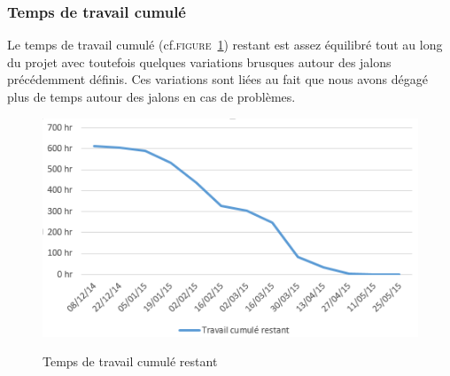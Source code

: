 \subsubsection{Temps de travail cumulé}
Le temps de travail cumulé (cf.\textsc{figure~\ref{fig:avancement}}) restant est assez équilibré tout au long du projet avec toutefois quelques variations brusques autour des jalons précédemment définis.
Ces variations sont liées au fait que nous avons dégagé plus de temps autour des jalons en cas de problèmes. 

\begin{figure}[h]
	\centering
	\caption{Temps de travail cumulé restant}
		\includegraphics[width=\textwidth]{8-BilanPlanification/img/avancement.PNG}
	\label{fig:avancement}
\end{figure}
